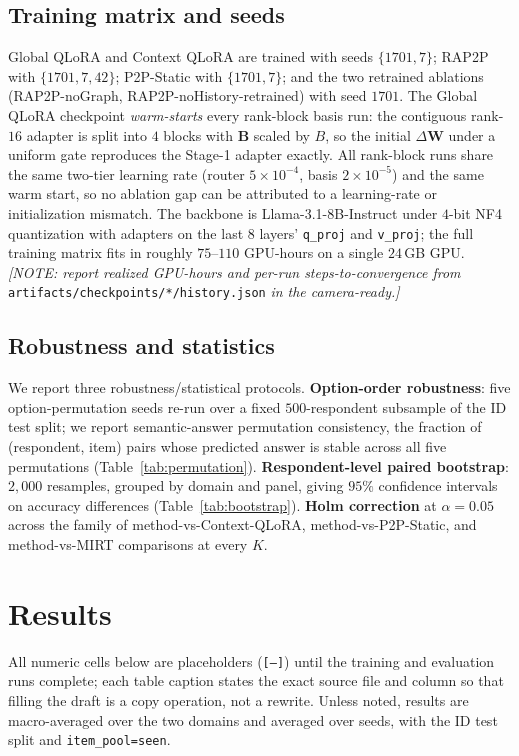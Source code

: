 \documentclass[letterpaper]{article} %
\begin{document}
\subsection{Training matrix and seeds}
Global QLoRA and Context QLoRA are trained with seeds $\{1701, 7\}$; RAP2P with
$\{1701, 7, 42\}$; P2P-Static with $\{1701, 7\}$; and the two retrained
ablations (RAP2P-noGraph, RAP2P-noHistory-retrained) with seed $1701$. The
Global QLoRA checkpoint \emph{warm-starts} every rank-block basis run: the
contiguous rank-$16$ adapter is split into $4$ blocks with $\bm{B}$ scaled by
$B$, so the initial $\Delta\bm{W}$ under a uniform gate reproduces the Stage-1
adapter exactly. All rank-block runs share the same two-tier learning rate
(router $5\!\times\!10^{-4}$, basis $2\!\times\!10^{-5}$) and the same warm
start, so no ablation gap can be attributed to a learning-rate or
initialization mismatch. The backbone is Llama-3.1-8B-Instruct under $4$-bit
NF4 quantization with adapters on the last $8$ layers' \texttt{q\_proj} and
\texttt{v\_proj}; the full training matrix fits in roughly $75$--$110$
GPU-hours on a single $24$\,GB GPU. \emph{[NOTE: report realized GPU-hours and
per-run steps-to-convergence from} \texttt{artifacts/checkpoints/*/history.json}
\emph{in the camera-ready.]}

\subsection{Robustness and statistics}
\label{sec:robustness}
We report three robustness/statistical protocols. \textbf{Option-order
robustness}: five option-permutation seeds re-run over a fixed
$500$-respondent subsample of the ID test split; we report semantic-answer
permutation consistency, the fraction of (respondent, item) pairs whose
predicted answer is stable across all five permutations
(Table~\ref{tab:permutation}). \textbf{Respondent-level paired bootstrap}:
$2{,}000$ resamples, grouped by domain and panel, giving $95\%$ confidence
intervals on accuracy differences (Table~\ref{tab:bootstrap}). \textbf{Holm
correction} at $\alpha{=}0.05$ across the family of
method-vs-Context-QLoRA, method-vs-P2P-Static, and method-vs-MIRT comparisons
at every $K$.

\section{Results}
\label{sec:results}

All numeric cells below are placeholders (\texttt{[--]}) until the training and
evaluation runs complete; each table caption states the exact source file and
column so that filling the draft is a copy operation, not a rewrite. Unless
noted, results are macro-averaged over the two domains and averaged over seeds,
with the ID test split and \texttt{item\_pool=seen}.
\end{document}

